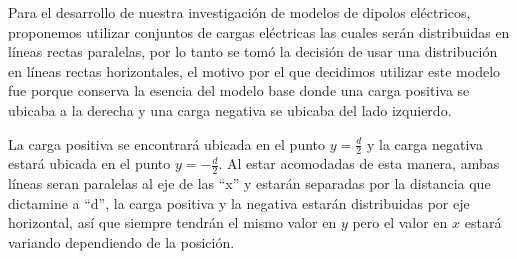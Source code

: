 \tab Para el desarrollo de nuestra investigación de modelos de dipolos eléctricos, proponemos utilizar conjuntos de cargas eléctricas las cuales serán distribuidas en líneas rectas paralelas, por lo tanto se tomó la decisión de usar una distribución en líneas rectas horizontales, el motivo por el que decidimos utilizar este modelo fue porque conserva la esencia del modelo base donde una carga positiva se ubicaba a la derecha y una carga negativa se ubicaba del lado izquierdo.

\tab La carga positiva se encontrará ubicada en el punto $y = \frac{d}{2}$ y la carga negativa estará ubicada en el punto $y = -\frac{d}{2}$. Al estar acomodadas de esta manera, ambas líneas seran paralelas al eje de las “x” y estarán separadas por la distancia que dictamine a “d”, la carga positiva y la negativa estarán distribuidas por eje horizontal, así que siempre tendrán el mismo valor en $y$ pero el valor en $x$ estará variando dependiendo de la posición.